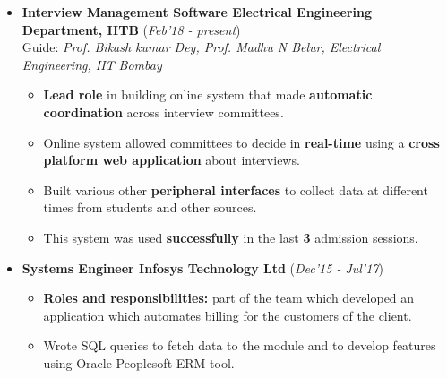 \documentclass[10pt]{article}
\begin{document}
\vspace{-0.1cm}
\begin{itemize}[leftmargin=0.4cm]
	\item \textbf{Interview Management Software \textpipe  \hspace{0.05cm} Electrical Engineering Department, IITB} \hfill{(\textit{Feb'18 - present})}\\
	Guide: \textit{Prof. Bikash kumar Dey, Prof. Madhu N Belur, Electrical Engineering, IIT Bombay}\\
\vspace{-0.65cm}
\begin{itemize}
		\item  \textbf{Lead role }in building online system that made \textbf{automatic
coordination }across interview committees.\vspace{-0.1cm}
		\item Online system allowed committees to decide in \textbf{real-time} using a \textbf{cross platform web application} about interviews.

		\item Built various other \textbf{peripheral
interfaces} to collect data at different times from students and other sources.
		\item This system was used \textbf{successfully} in the last \textbf{3} admission sessions.
	\end{itemize}
\end{itemize}
\vspace{-0.4cm}
\begin{itemize}[leftmargin=0.4cm]
	\item \textbf{Systems Engineer \textpipe  \hspace{0.05cm} Infosys Technology Ltd} \hfill{(\textit{Dec'15 - Jul'17})}\\
	\vspace{-0.65cm}
	\begin{itemize}
\vspace{-0.07cm}
		\item \textbf{Roles and responsibilities:} part of the team which developed an application which automates billing for the customers of the client.\vspace{-0.1cm}
		\item Wrote SQL queries to fetch data to the module and to develop features using Oracle Peoplesoft ERM tool.
	\end{itemize}
\end{itemize}

\end{document}
